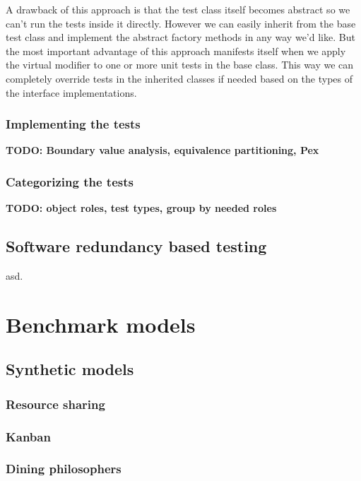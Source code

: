 A drawback of this approach is that the test class itself becomes abstract so we can't run the tests inside it directly. However we can easily inherit from the base test class and implement the abstract factory methods in any way we'd like. But the most important advantage of this approach manifests itself when we apply the virtual modifier to one or more unit tests in the base class. This way we can completely override tests in the inherited classes if needed based on the types of the interface implementations.

\subsubsection{Implementing the tests}

\textbf{TODO: Boundary value analysis, equivalence partitioning, Pex}

\subsubsection{Categorizing the tests}

\textbf{TODO: object roles, test types, group by needed roles}

\subsection{Software redundancy based testing}

asd.

\section{Benchmark models}

\subsection{Synthetic models}

\subsubsection{Resource sharing}

\subsubsection{Kanban}

\subsubsection{Dining philosophers}

